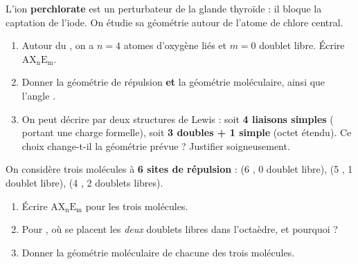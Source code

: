 \documentclass[11pt,a4paper]{article}
\newcommand{\AX}[2]{\ensuremath{\mathrm{AX_{#1}E_{#2}}}}
\begin{document}
\begin{exo}
L'ion \textbf{perchlorate}  est un perturbateur de la glande thyroïde : il bloque la
captation de l'iode. On étudie sa géométrie autour de l'atome de chlore central.
\begin{enumerate}[label=\alph*),leftmargin=2em,itemsep=2pt]
  \item Autour du , on a $n=4$ atomes d'oxygène liés et $m=0$ doublet libre. Écrire
        \AX{n}{m}.
  \item Donner la géométrie de répulsion \textbf{et} la géométrie moléculaire, ainsi que l'angle
        .
  \item On peut décrire  par deux structures de Lewis : soit \textbf{4 liaisons simples}
        ( portant une charge formelle), soit \textbf{3 doubles + 1 simple} (octet étendu). Ce
        choix change-t-il la géométrie prévue ? Justifier soigneusement.
\end{enumerate}
\end{exo}

\begin{exo}
On considère trois molécules à \textbf{6 sites de répulsion} :  (6 , 0 doublet
libre),  (5 , 1 doublet libre),  (4 , 2 doublets libres).
\begin{enumerate}[label=\alph*),leftmargin=2em,itemsep=2pt]
  \item Écrire \AX{n}{m} pour les trois molécules.
  \item Pour , où se placent les \emph{deux} doublets libres dans l'octaèdre, et pourquoi ?
  \item Donner la géométrie moléculaire de chacune des trois molécules.
\end{enumerate}
\end{exo}
\end{document}
